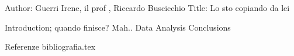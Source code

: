 Author: Guerri Irene, il prof , Riccardo Buscicchio
Title: Lo sto copiando da lei


Introduction; quando finisce? Mah..
Data
Analysis
Conclusions

Referenze
bibliografia.tex

